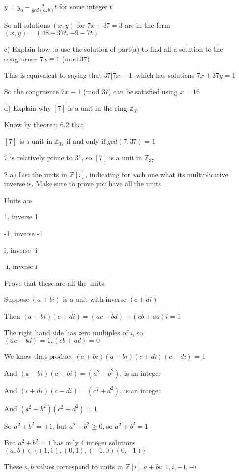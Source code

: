 \documentclass[11pt]{article}
\begin{document}
\begin{itemize}
  $y = y_0 - \frac{a}{gcd(a,b)} t$ for some integer $t$

  So all solutions $(x,y)$ for $7x + 37 = 3$ are in the form $(x,y) = (48 + 37t, -9 - 7t)$

  c) Explain how to use the solution of part(a) to find all a solution to the congruence $7x \equiv 1$ (mod 37)

  This is equivalent to saying that $37 | 7x - 1$, which has solutions $7x + 37y = 1$

  So the congruence $7x \equiv 1$ (mod 37) can be satisfied using $x = 16$

  d) Explain why $[7]$ is a unit in the ring $\mathbb{Z}_{37}$

  Know by theorem 6.2 that 

  $[7]$ is a unit in $\mathbb{Z}_{37}$ if and only if $gcd(7,37) = 1$

  7 is relatively prime to 37, so $[7]$ is a unit in $\mathbb{Z}_{37}$

\item[2]
  a) List the units in $\mathbb{Z}[i]$, indicating for each one what its multiplicative inverse is. Make sure to prove you have all the units

  Units are

  1, inverse 1

  -1, inverse -1

  i, inverse -i

  -i, inverse i

  Prove that these are all the units

  Suppose $(a + bi)$ is a unit with inverse $(c + di)$

  Then $(a + bi)(c + di) = (ac - bd) + (cb + ad)i = 1$

  The right hand side has zero multiples of $i$, so $(ac - bd) = 1, (cb + ad) = 0$

  We know that product $(a + bi)(a - bi)(c + di)(c - di)$ = 1

  And $(a+bi)(a-bi) = (a^2 + b^2)$, is an integer

  And $(c+di)(c-di) = (c^2 + d^2)$, is an integer

  And $(a^2 + b^2)(c^2 + d^2) = 1$

  So $a^2 + b^2 = \pm 1$, but $a^2 + b^2 \geq 0$, so $a^2 + b^2 = 1$

  But $a^2 + b^2 = 1$ has only 4 integer solutions $(a,b) \in \{ (1,0), (0,1), (-1,0) (0,-1) \}$

  These $a,b$ values correspond to units in $\mathbb{Z}[i]$ $a + bi$: $1, i, -1, -i$


\end{itemize}
\end{document}
